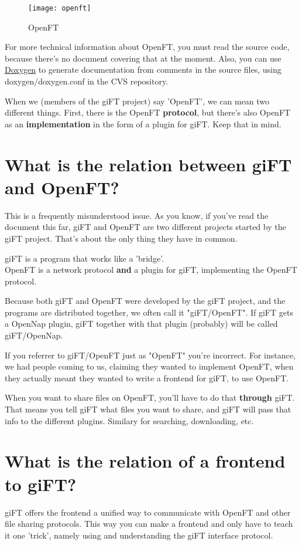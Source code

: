 \documentclass[10pt]{article}
\begin{document}
\begin{figure}[ht]
  \begin{center}
    \texttt{[image: openft]}
  \end{center}
  \caption{OpenFT}
\end{figure}

For more technical information about OpenFT, you must read the source code,
because there's no document covering that at the moment. Also, you can use
\href{http://doxygen.org}{Doxygen} to generate documentation from comments in
the source files, using doxygen/doxygen.conf in the CVS repository.

When we (members of the giFT project) say 'OpenFT', we can mean two different
things. First, there is the OpenFT \textbf{protocol}, but there's also OpenFT
as an \textbf{implementation} in the form of a plugin for giFT. Keep that in
mind.

\section{What is the relation between giFT and OpenFT?}
This is a frequently misunderstood issue. As you know, if you've read the
document this far, giFT and OpenFT are two different projects started by the
giFT project. That's about the only thing they have in common.

giFT is a program that works like a 'bridge'.\\
OpenFT is a network protocol \textbf{and} a plugin for giFT, implementing the
OpenFT protocol.

Because both giFT and OpenFT were developed by the giFT project, and the
programs are distributed together, we often call it "giFT/OpenFT". If giFT gets
a OpenNap plugin, giFT together with that plugin (probably) will be called
giFT/OpenNap.

If you referrer to giFT/OpenFT just as "OpenFT" you're incorrect. For instance,
we had people coming to us, claiming they wanted to implement OpenFT, when they
actually meant they wanted to write a frontend for giFT, to use OpenFT.

When you want to share files on OpenFT, you'll have to do that \textbf{through}
giFT. That means you tell giFT what files you want to share, and giFT will pass
that info to the different plugins. Similary for searching, downloading, etc.

\section{What is the relation of a frontend to giFT?}
giFT offers the frontend a unified way to communicate with OpenFT and other
file sharing protocols. This way you can make a frontend and only have to teach
it one 'trick', namely using and understanding the giFT interface protocol.
\end{document}
